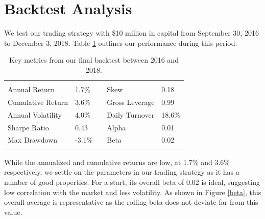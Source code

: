 \documentclass[11,]{article}
\begin{document}
\hypertarget{backtest-analysis}{%
\section{Backtest Analysis}\label{backtest-analysis}}

We test our trading strategy with \$10 million in capital from September
30, 2016 to December 3, 2018. Table \ref{bt} outlines our performance
during this period:

\begin{table}[ht]
\centering
\caption{Key metrics from our final backtest between 2016 and 2018.}
\begin{tabular}{lllll}
                                        &                             &                       &                                     &                             \\ \cline{1-2} \cline{4-5} 
\multicolumn{1}{|l|}{Annual Return}     & \multicolumn{1}{l|}{1.7\%}  & \multicolumn{1}{l|}{} & \multicolumn{1}{l|}{Skew}           & \multicolumn{1}{l|}{0.18}   \\ \cline{1-2} \cline{4-5} 
\multicolumn{1}{|l|}{Cumulative Return} & \multicolumn{1}{l|}{3.6\%}  & \multicolumn{1}{l|}{} & \multicolumn{1}{l|}{Gross Leverage} & \multicolumn{1}{l|}{0.99}   \\ \cline{1-2} \cline{4-5} 
\multicolumn{1}{|l|}{Annual Volatility} & \multicolumn{1}{l|}{4.0\%}  & \multicolumn{1}{l|}{} & \multicolumn{1}{l|}{Daily Turnover} & \multicolumn{1}{l|}{18.6\%} \\ \cline{1-2} \cline{4-5} 
\multicolumn{1}{|l|}{Sharpe Ratio}      & \multicolumn{1}{l|}{0.43}   & \multicolumn{1}{l|}{} & \multicolumn{1}{l|}{Alpha}          & \multicolumn{1}{l|}{0.01}   \\ \cline{1-2} \cline{4-5} 
\multicolumn{1}{|l|}{Max Drawdown}      & \multicolumn{1}{l|}{-3.1\%} & \multicolumn{1}{l|}{} & \multicolumn{1}{l|}{Beta}           & \multicolumn{1}{l|}{0.02}   \\ \cline{1-2} \cline{4-5} 
                                        &                             &                       &                                     &                            
\end{tabular}
\label{bt}
\end{table}

While the annualized and cumulative returns are low, at 1.7\% and 3.6\%
respectively, we settle on the parameters in our trading strategy as it
has a number of good properties. For a start, its overall beta of 0.02
is ideal, suggesting low correlation with the market and less
volatility. As shown in Figure \ref{beta}, this overall average is
representative as the rolling beta does not deviate far from this value.
\end{document}
